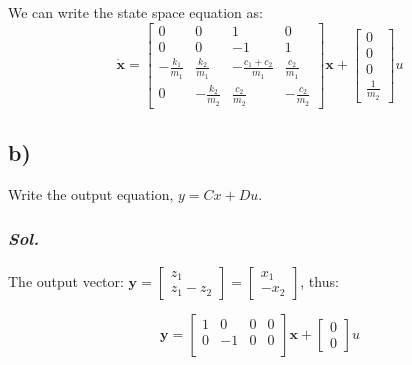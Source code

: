 We can write the state space equation as:
\begin{equation}
    \dot{\textbf{x}} =
        \begin{bmatrix}
        0                & 0                & 1                    & 0 \\
        0                & 0                & -1                   & 1 \\ 
        -\frac{k_1}{m_1} & \frac{k_2}{m_1}  & -\frac{c_1+c_2}{m_1} & \frac{c_2}{m_1}  \\ 
        0                & -\frac{k_2}{m_2} & \frac{c_2}{m_2}      & -\frac{c_2}{m_2}
    \end{bmatrix}
    \textbf{x} + 
    \begin{bmatrix}
        0\\
        0\\ 
        0\\ 
        \frac{1}{m_2}
    \end{bmatrix}
    u
\end{equation}

\subsection{b)}
Write the output equation, $y = Cx + Du$.
\subsubsection{\textit{ Sol. }}
The output vector: $\textbf{y} = 
\begin{bmatrix}
    z_1\\
    z_1 - z_2
\end{bmatrix} = 
\begin{bmatrix}
    x_1\\
    - x_2
\end{bmatrix}$, thus: 

\begin{equation}
    \textbf{y} =
        \begin{bmatrix}
        1 & 0  & 0 & 0 \\
        0 & -1 & 0 & 0 \\ 
    \end{bmatrix}
    \textbf{x} + 
    \begin{bmatrix}
        0\\
        0
    \end{bmatrix}
    u
\end{equation}

\pagebreak